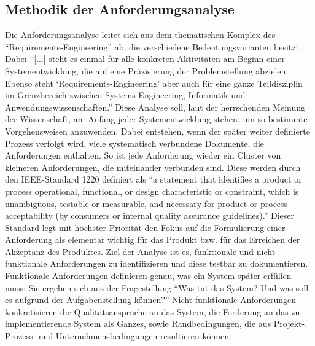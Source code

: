 \subsection{Methodik der Anforderungsanalyse}\label{kap:methodikAnfAnalyse}
Die Anforderungsanalyse leitet sich aus dem thematischen Komplex des \enquote{Requirements-Engineering} ab, die verschiedene Bedeutungsvarianten besitzt. Dabei \enquote{[...] steht es einmal für alle konkreten Aktivitäten am Beginn einer Systementwicklung, die auf eine Präzisierung der Problemstellung abzielen. Ebenso steht \enquote{Requirements-Engineering} aber auch für eine ganze Teildisziplin im Grenzbereich zwischen Systems-Engineering, Informatik und Anwendungswissenschaften.}\autocite[][S.\,19]{partsch_requirements-engineering_2010} Diese Analyse soll, laut der herrschenden Meinung der Wissenschaft, am Anfang jeder Systementwicklung stehen, um so bestimmte Vorgehensweisen anzuwenden. Dabei entstehen, wenn der später weiter definierte Prozess verfolgt wird, viele systematisch verbundene Dokumente, die Anforderungen enthalten. So ist jede Anforderung wieder ein Cluster von kleineren Anforderungen, die miteinander verbunden sind. Diese werden durch den IEEE-Standard 1220 definiert als \enquote{a statement that identifies a product or process operational, functional, or design characteristic or constraint, which is unambiguous, testable or measurable, and necessary for product or process acceptability (by consumers or internal quality assurance guidelines).}\autocite[][S.\,9]{IEEE1220-2005SystemsEng} Dieser Standard legt mit höchster Priorität den Fokus auf die Formulierung einer Anforderung als elementar wichtig für das Produkt bzw. für das Erreichen der Akzeptanz des Produktes. Ziel der Analyse ist es, funktionale und nicht-funktionale Anforderungen zu identifizieren und diese testbar zu dokumentieren. Funktionale Anforderungen definieren genau, was ein System später erfüllen muss: Sie ergeben sich aus der Fragestellung \enquote{Was tut das System? Und was soll es aufgrund der Aufgabenstellung können?}\autocite[][S.\,27]{partsch_requirements-engineering_2010} Nicht-funktionale Anforderungen konkretisieren die Qualitätsansprüche an das System, die Forderung an das zu implementierende System als Ganzes, sowie Randbedingungen, die aus Projekt-, Prozess- und Unternehmensbedingungen resultieren können.\autocite[vgl.][S.\,27-29]{partsch_requirements-engineering_2010}

